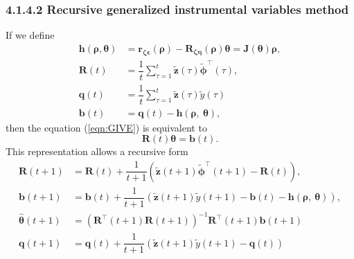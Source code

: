 \documentclass[11pt]{article}
\begin{document}
\begin{itemize}
\begin{itemize}
        \subsubsection*{4.1.4.2 Recursive generalized instrumental variables method}
        If we define
        \begin{equation} \tag{4.35} \begin{aligned} \mathbf{h} \left( \bm{\rho}, \bm{\theta} \right)  &=  \mathbf{r}_{ \bm{\zeta} \bm{\epsilon}} \left( \bm{\rho} \right) - \mathbf{R}_{\bm{\zeta} \bm{\eta}} \left( \bm{\rho} \right) \bm{\theta}  =  \mathbf{J} \left( \bm{\theta} \right) \bm{\rho}, \\
        \mathbf{R} \left( t \right)  &=  \dfrac{1}{t} \sum_{\tau=1}^{t} \widetilde{\mathbf{z}} \left( \tau \right) \widetilde{\bm{\phi}}^\top \left( \tau \right) , \\     
        \mathbf{q} \left( t \right)  &=  \dfrac{1}{t} \sum_{\tau=1}^{t} \widetilde{\mathbf{z}} \left( \tau \right) \widetilde{y} \left( \tau \right) \\     
        \mathbf{b} \left( t \right)  &=  \mathbf{q} \left( t \right) - \mathbf{h} \left( \bm{\rho}, \ \bm{\theta} \right)
        , \end{aligned} \end{equation}
        then the equation (\ref{eqn:GIVE}) is equivalent to
        \begin{equation} \tag{4.36} \mathbf{R} \left( t \right) \bm{\theta} = \mathbf{b} \left( t \right) . \end{equation}
        This representation allows a recursive form
        \begin{equation} \tag{4.37} \begin{aligned} 
        \mathbf{R} \left( t+1 \right)  &= \mathbf{R} \left( t \right) + \dfrac{1}{t+1} \left( \widetilde{\mathbf{z}} \left( t+1 \right) \widetilde{\bm{\phi}}^\top \left( t+1 \right) - \mathbf{R} \left( t \right) \right), \\
        \mathbf{b} \left( t+1 \right)  &= \mathbf{b} \left( t \right) + \dfrac{1}{t+1} \left( \widetilde{\mathbf{z}} \left( t+1 \right) \widetilde{y} \left( t+1 \right) - \mathbf{b} \left( t \right) - \mathbf{h} \left( \bm{\rho}, \ \bm{\theta} \right) \right), \\
        \widehat{\bm{\theta}} \left( t+1 \right)  &=  \left( \mathbf{R}^\top \left( t+1 \right) \mathbf{R} \left( t+1 \right) \right)^{-1} \mathbf{R}^\top \left( t+1 \right) \mathbf{b} \left( t+1 \right) \\
        \mathbf{q} \left( t+1 \right)  &= \mathbf{q} \left( t \right) + \dfrac{1}{t+1} \left( \widetilde{\mathbf{z}} \left( t+1 \right) \widetilde{y} \left( t+1 \right) - \mathbf{q} \left( t \right) \right) \\

\end{aligned}
\end{equation}
\end{itemize}
\end{itemize}
\end{document}
